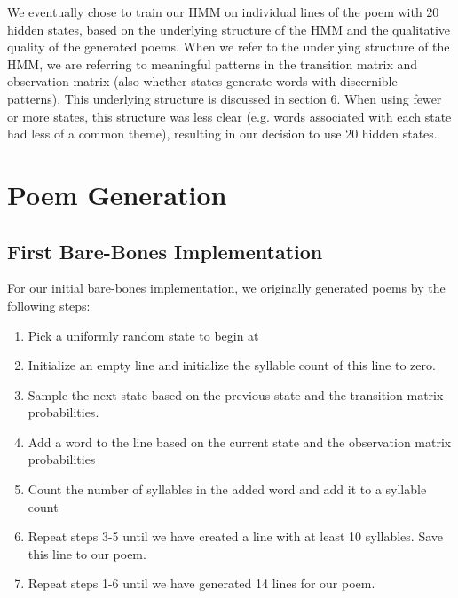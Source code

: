 We eventually chose to train our HMM on individual lines of the poem with 20 hidden states, based on the underlying structure of the HMM and the qualitative quality of the generated poems. When we refer to the underlying structure of the HMM, we are referring to meaningful patterns in the transition matrix and observation matrix (also whether states generate words with discernible patterns). This underlying structure is discussed in section 6. When using fewer or more states, this structure was less clear (e.g. words associated with each state had less of a common theme), resulting in our decision to use 20 hidden states. 

\medskip

\section{Poem Generation}

\subsection*{First Bare-Bones Implementation}

For our initial bare-bones implementation, we originally generated poems by the following steps:

\begin{enumerate}

\item Pick a uniformly random state to begin at

\item Initialize an empty line and initialize the syllable count of this line to zero.

\item Sample the next state based on the previous state and the transition matrix probabilities.

\item Add a word to the line based on the current state and the observation matrix probabilities

\item Count the number of syllables in the added word and add it to a syllable count

\item Repeat steps 3-5 until we have created a line with at least 10 syllables. Save this line to our poem.

\item Repeat steps 1-6 until we have generated 14 lines for our poem.

\end{enumerate}

